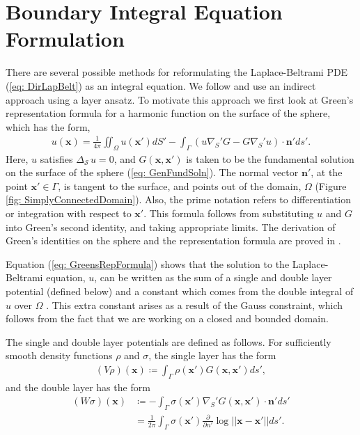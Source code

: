 \documentclass{sfuthesis}
\begin{document}
\section{Boundary Integral Equation Formulation}
\label{sec: BIEFormulation}
There are several possible methods for reformulating the Laplace-Beltrami PDE (\ref{eq: DirLapBelt}) as an integral equation. We follow \cite{GemmNigStein2008, KropNig2014} and use an indirect approach using a layer ansatz. To motivate this approach we first look at Green's representation formula for a harmonic function on the surface of the sphere, which has the form, 
\begin{align}
	u(\mathbf{x})=\frac{1}{4\pi}\iint_{\Omega}u(\mathbf{x'})dS'-\int_{\Gamma}\left(u{\nabla}_S'G-G{\nabla}_S'u\right)\cdot \mathbf{n'}ds'.  \label{eq: GreensRepFormula}  
\end{align}
Here, $u$ satisfies ${\Delta}_{\mathcal{S}\ }u=0$, and $G(\mathbf{x},\mathbf{x'})$ is taken to be the fundamental solution on the surface of the sphere (\ref{eq: GenFundSoln}). The normal vector $\mathbf{n}'$, at the point $\mathbf{x'}\in \Gamma$, is tangent to the surface, and points out of the domain, $\Omega$ (Figure \ref{fig: SimplyConnectedDomain}). Also, the prime notation refers to differentiation or integration with respect to $\mathbf{x'}$. This formula follows from substituting $u$ and $G$ into Green's second identity, and taking appropriate limits. The derivation of Green's identities on the sphere and the representation formula are proved in \cite{GemmNigStein2008}. 

Equation (\ref{eq: GreensRepFormula}) shows that the solution to the Laplace-Beltrami equation, $u$, can be written as the sum of a single and double layer potential (defined below) and a constant which comes from the double integral of $u$ over $\Omega$ \cite{GemmNigStein2008}. This extra constant arises as a result of the Gauss constraint, which follows from the fact that we are working on a closed and bounded domain.  

The single and double layer potentials are defined as follows. For sufficiently smooth density functions $\rho$ and $\sigma$, the single layer has the form
\begin{align*}
	(V\rho)(\mathbf{x}) \coloneqq \int_\Gamma \rho(\mathbf{x'})G(\mathbf{x},\mathbf{x'})ds',
\end{align*}
and the double layer has the form 
\begin{align}
	(W\sigma)(\mathbf{x})&\coloneqq -\int_{\Gamma} \sigma(\mathbf{x'}){\nabla}_S' G(\mathbf{x},\mathbf{x'}) \cdot \mathbf{n'}ds' \nonumber \\
					      &=\frac{1}{2\pi}\int_{\Gamma}\sigma(\mathbf{x'})\frac{\partial}{\partial n'}\log||\mathbf{x}-\mathbf{x'}|| ds'. \label{eq: DLP} 
\end{align}
\end{document}
